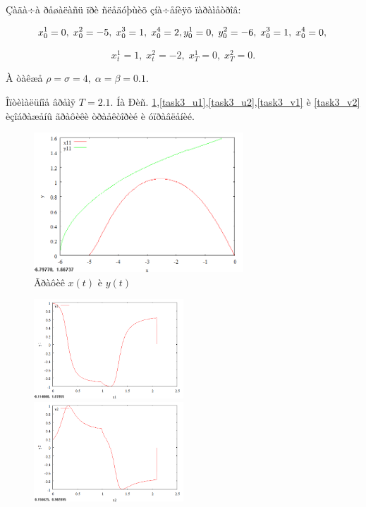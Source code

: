 \documentclass[14pt]{article}
\begin{document}
Çàäà÷à ðåøàëàñü ïðè ñëåäóþùèõ çíà÷åíèÿõ ïàðàìåòðîâ:

$$
    x^1_0 = 0,\; x^2_0 = -5,\; x^3_0 = 1,\; x^4_0 = 2, \\
    y^1_0 = 0,\; y^2_0 = -6,\; x^3_0 = 1,\; x^4_0 = 0, \\
$$

$$
    x^1_t = 1,\; x^2_t = -2,\; x^1_T = 0,\; x^2_T = 0.
$$

À òàêæå $\rho = \sigma = 4,\; \alpha = \beta = 0.1$.

Îïòèìàëüíîå âðåìÿ $ T = 2.1 $. Íà Ðèñ. \ref{task3_xy},\ref{task3_u1},\ref{task3_u2},\ref{task3_v1} è \ref{task3_v2} èçîáðàæåíû ãðàôèêè òðàåêòîðèé è óïðàâëåíèé.

\begin{figure}
\centering
\includegraphics[width=0.7\textwidth]{task3_xy}
\caption{Ãðàôèê $x(t)$ è $y(t)$}
\label{task3_xy}
\end{figure}

\begin{figure}
\begin{floatrow}
    {\includegraphics[width=0.5\textwidth]{task3_u1}}
    {\includegraphics[width=0.5\textwidth]{task3_u2}}
\end{floatrow}
\end{figure}
\end{document}
